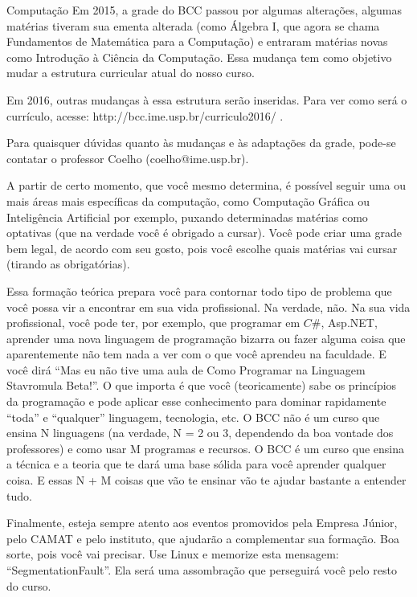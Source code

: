 \begin{subsecao}{Computação}
Em 2015, a grade do BCC passou por algumas alterações, algumas matérias
tiveram sua ementa alterada (como Álgebra I, que agora se chama
Fundamentos de Matemática para a Computação) e entraram matérias novas como Introdução à 
Ciência da Computação. Essa mudança tem como objetivo mudar a estrutura curricular
atual do nosso curso. 

Em 2016, outras mudanças à essa estrutura serão inseridas.
Para ver como será o currículo, acesse: http://bcc.ime.usp.br/curriculo2016/ .

Para quaisquer dúvidas quanto às mudanças e às adaptações da grade, pode-se
contatar o professor Coelho (coelho@ime.usp.br).

A partir de certo momento, que você mesmo determina, é possível seguir uma
ou mais áreas mais específicas da computação, como Computação Gráfica ou
Inteligência Artificial por exemplo, puxando determinadas matérias como
optativas (que na verdade você é obrigado a cursar). Você pode criar uma grade
bem legal, de acordo com seu gosto, pois você escolhe quais matérias vai
cursar (tirando as obrigatórias).

Essa formação teórica prepara você para contornar todo tipo de problema que
você possa vir a encontrar em sua vida profissional. Na verdade, não. Na sua
vida profissional, você pode ter, por exemplo, que programar em $C\#$, Asp.NET,
aprender uma nova linguagem de programação bizarra ou fazer alguma coisa que
aparentemente não tem nada a ver com o que você aprendeu na faculdade. E você
dirá ``Mas eu não tive uma aula de Como Programar na Linguagem Stavromula
Beta!''. O que importa é que você (teoricamente) sabe os princípios da
programação e pode aplicar esse conhecimento para dominar rapidamente ``toda''
e ``qualquer'' linguagem, tecnologia, etc. O BCC não é um curso que ensina N
linguagens (na verdade, N = 2 ou 3, dependendo da boa vontade dos professores) e
como usar M programas e recursos. O BCC é um curso que ensina a técnica e a
teoria que te dará uma base sólida para você aprender qualquer
coisa. E essas N + M coisas que vão te ensinar vão te ajudar bastante a
entender tudo.

Finalmente, esteja sempre atento aos eventos promovidos pela Empresa Júnior,
pelo CAMAT e pelo instituto, que ajudarão a complementar sua formação. Boa
sorte, pois você vai precisar. Use Linux e memorize esta
mensagem: ``SegmentationFault''. Ela será uma assombração que perseguirá você
pelo resto do curso.

\end{subsecao}
